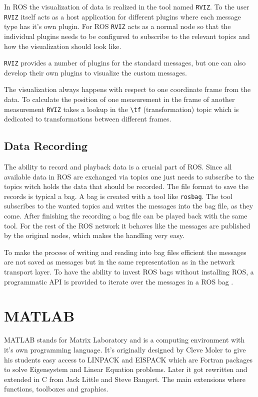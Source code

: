 In ROS the visualization of data is realized in the tool named \texttt{RVIZ}.
To the user \texttt{RVIZ} itself acts as a host application for different plugins where each message type has it's own plugin.
For ROS \texttt{RVIZ} acts as a normal node so that the individual plugins needs to be configured to subscribe to the relevant topics and how the visualization should look like.

\texttt{RVIZ} provides a number of plugins for the standard messages, but one can also develop their own plugins to visualize the custom messages.

The visualization always happens with respect to one coordinate frame from the data.
To calculate the position of one measurement in the frame of another measurement \texttt{RVIZ} takes a lookup in the \texttt{\textbackslash tf} (transformation) topic which is dedicated to transformations between different frames.

\subsection{Data Recording}\label{ssec:dataRecording}

The ability to record and playback data is a crucial part of ROS.
Since all available data in ROS are exchanged via topics one just needs to subscribe to the topics witch holds the data that should be recorded.
The file format to save the records is typical a bag.
A bag is created with a tool like \texttt{rosbag}.
The tool subscribes to the wanted topics and writes the messages into the bag file, as they come.
After finishing the recording a bag file can be played back with the same tool.
For the rest of the ROS network it behaves like the messages are published by the original nodes, which makes the handling very easy.

To make the process of writing and reading into bag files efficient the messages are not saved as messages but in the same representation as in the network transport layer.
To have the ability to invest \ac{ROS} bags without installing \ac{ROS}, a programmatic API is provided to iterate over the messages in a \ac{ROS} bag \cite{rosBag}.


\section{MATLAB}\label{sec:matlab}
MATLAB stands for Matrix Laboratory and is a computing environment with it's own programming language.
It's originally designed by Cleve Moler to give his students easy access to LINPACK and EISPACK which are Fortran packages to solve Eigensystem and Linear Equation problems.
Later it got rewritten and extended in C from Jack Little and Steve Bangert.
The main extensions where functions, toolboxes and graphics.

